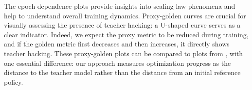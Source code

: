 The epoch-dependence plots provide insights into scaling law phenomena \cite{kaplan2020scaling} and help to understand overall training dynamics. Proxy-golden curves are crucial for visually assessing the presence of teacher hacking: a U-shaped curve serves as a clear indicator. Indeed, we expect the proxy metric to be reduced during training, and if the golden metric first decreases and then increases, it directly shows teacher hacking. These proxy-golden plots can be compared to plots from \citet{gao2023scaling}, with one essential difference: our approach measures optimization progress as the distance to the teacher model rather than the distance from an initial reference policy.


